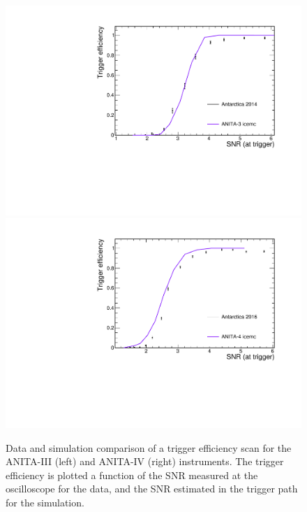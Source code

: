 \begin{figure}[!h]\centering
  \includegraphics[width=.45\linewidth]{./Figs/EfficiencyScanNoDelaysA3_efficiencyVSsnrTrigger.pdf}
    \includegraphics[width=.45\linewidth]{./Figs/EfficiencyScanNoDelaysA4_efficiencyVSsnrTrigger.pdf}
  \caption{Data and simulation comparison of a trigger efficiency scan for the ANITA-III (left) and ANITA-IV (right) instruments. 
    The trigger efficiency is plotted a function of the SNR
    measured at the oscilloscope for the data, and the SNR estimated in the trigger path for the simulation. 
    }
  \label{fig:scans}
\end{figure}

